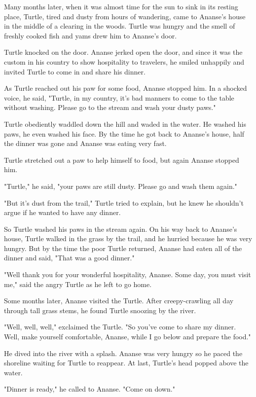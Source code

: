 Many months later, when it was almost time for the sun to sink in its resting place, Turtle, tired and dusty from hours of wandering, came to Ananse's house in the middle of a clearing in the woods. Turtle was hungry and the smell of freshly cooked fish and yams drew him to Ananse's door.

Turtle knocked on the door. Ananse jerked open the door, and since it was the custom in his country to show hospitality to travelers, he smiled unhappily and invited Turtle to come in and share his dinner.

As Turtle reached out his paw for some food, Ananse stopped him. In a shocked voice, he said, "Turtle, in my country, it's bad manners to come to the table without washing. Please go to the stream and wash your dusty paws."

Turtle obediently waddled down the hill and waded in the water. He washed his paws, he even washed his face. By the time he got back to Ananse's house, half the dinner was gone and Ananse was eating very fast.

Turtle stretched out a paw to help himself to food, but again Ananse stopped him.

"Turtle," he said, "your paws are still dusty. Please go and wash them again."

"But it's dust from the trail," Turtle tried to explain, but he knew he shouldn't argue if he wanted to have any dinner.

So Turtle washed his paws in the stream again. On his way back to Ananse's house, Turtle walked in the grass by the trail, and he hurried because he was very hungry. But by the time the poor Turtle returned, Ananse had eaten all of the dinner and said, "That was a good dinner."

"Well thank you for your wonderful hospitality, Ananse. Some day, you must visit me," said the angry Turtle as he left to go home.

Some months later, Ananse visited the Turtle. After creepy-crawling all day through tall grass stems, he found Turtle snoozing by the river.

"Well, well, well," exclaimed the Turtle. "So you've come to share my dinner. Well, make yourself comfortable, Ananse, while I go below and prepare the food."

He dived into the river with a splash. Ananse was very hungry so he paced the shoreline waiting for Turtle to reappear. At last, Turtle's head popped above the water.

"Dinner is ready," he called to Ananse. "Come on down."

